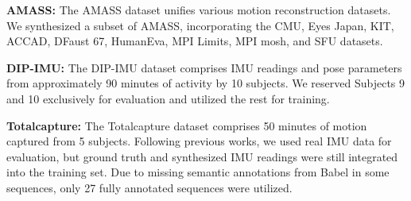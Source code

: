 \documentclass[letterpaper]{article} %
\begin{document}
\textbf{AMASS:} The AMASS dataset unifies various motion reconstruction datasets. We synthesized a subset of AMASS, incorporating the CMU, Eyes Japan, KIT, ACCAD, DFaust 67, HumanEva, MPI Limits, MPI mosh, and SFU datasets.

\textbf{DIP-IMU:} The DIP-IMU dataset comprises IMU readings and pose parameters from approximately 90 minutes of activity by 10 subjects. We reserved Subjects 9 and 10 exclusively for evaluation and utilized the rest for training.

\textbf{Totalcapture:} The Totalcapture dataset \cite{trumble2017total}
comprises 50 minutes of motion captured from 5 subjects. Following previous works, we used real IMU data for evaluation, but ground truth and synthesized IMU readings were still integrated into the training set. Due to missing semantic annotations from Babel in some sequences, only 27 fully annotated sequences were utilized.
\end{document}

